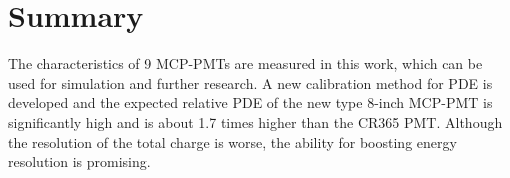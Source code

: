 \section{Summary}
\label{Summary}
The characteristics of 9 MCP-PMTs are measured in this work, which can be used for simulation and further research. A new calibration method for PDE is developed and the expected relative PDE of the new type 8-inch MCP-PMT is significantly high and is about 1.7 times higher than the CR365 PMT. Although the resolution of the total charge is worse, the ability for boosting energy resolution is promising.